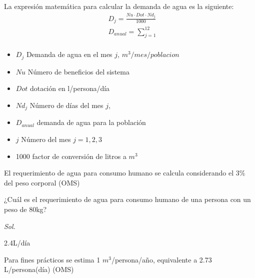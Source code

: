 La expresión matemática para calcular la demanda de agua es la siguiente:
\begin{align}
    &D_j =\frac{Nu \cdot Dot \cdot Nd_j}{1000}\\
    &D_{anual} =\sum_{j = 1}^{12}\\
\end{align}
\begin{notation}
    \begin{itemize}
        \item $D_j$ Demanda de agua en el mes $j$, $m^3/mes/poblacion$
        \item $Nu$ Número de beneficios del sistema
        \item $Dot$ dotación en l/persona/día
        \item $Nd_j$ Número de días del mes $j$,
        \item $D_{anual}$ demanda de agua para la población
        \item $j$ Número del mes $j=1,2,3$
        \item 1000 factor de conversión de litros a $m^3$
    \end{itemize}
\end{notation}
\begin{example}
    El requerimiento de agua para consumo humano se calcula considerando el 3\% del peso corporal (OMS)

    ¿Cuál es el requerimiento de agua para consumo humano de una persona con un peso de 80kg?

    \textit{ Sol. }

    2.4L/día

    Para fines prácticos se estima 1 $m^3$/persona/año, equivalente a 2.73 L/persona(día) (OMS)
\end{example}

